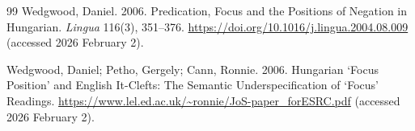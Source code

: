 \documentclass[a4paper, ruler]{CUP-JNL-LIN}%
\begin{document}
\begin{Backmatter}
\begin{thebibliography}{99}
{Wedgwood, Daniel}. 2006. Predication, Focus and the Positions of Negation in Hungarian. \textit{Lingua} 116(3), 351--376. \url{https://doi.org/10.1016/j.lingua.2004.08.009} (accessed 2026 February 2).




{Wedgwood, Daniel; Petho, Gergely; Cann, Ronnie}. 2006. Hungarian ‘Focus Position’ and English It-Clefts: The Semantic Underspecification of ‘Focus’ Readings. \url{https://www.lel.ed.ac.uk/~ronnie/JoS-paper_forESRC.pdf} (accessed 2026 February 2).




\end{thebibliography}
\end{Backmatter}
\end{document}
